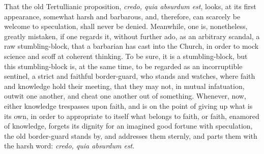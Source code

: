 \documentclass[12pt]{book}
\begin{document}
That the old Tertullianic proposition, \textit{credo, quia absurdum est}, looks, at its first appearance, somewhat harsh and barbarous, and, therefore, can scarcely be welcome to speculation, shall never be denied. Meanwhile, one is, nonetheless, greatly mistaken, if one regards it, without further ado, as an arbitrary scandal, a raw stumbling-block, that a barbarian has cast into the Church, in order to mock science and scoff at coherent thinking. To be sure, it is a stumbling-block, but this stumbling-block is, at the same time, to be regarded as an incorruptible sentinel, a strict and faithful border-guard, who stands and watches, where faith and knowledge hold their meeting, that they may not, in mutual infatuation, outwit one another, and cheat one
another out of something. Whenever, now, either knowledge trespasses upon faith, and is on the point of giving up what is its own, in order to appropriate to itself what belongs to faith, or faith, enamored of knowledge, forgets its dignity for an imagined good fortune with speculation, the old border-guard stands by, and addresses them sternly, and parts them with the harsh word: \textit{credo, quia absurdum est}.
\end{document}
